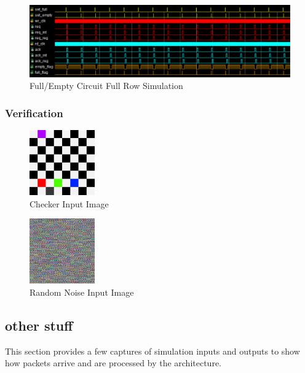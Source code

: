 \begin{figure}
    \centering
    \includegraphics[width=1.0\textwidth]{fig/full_empty_row_sim.png}
    \caption{Full/Empty Circuit Full Row Simulation}
    \label{fig:full_empty_row_sim}
\end{figure}

\subsubsection{Verification}

\begin{figure}
    \centering
    \includegraphics[width=0.25\textwidth]{fig/checker.png}
    \caption{Checker Input Image}
    \label{fig:checker_pattern}
\end{figure}

\begin{figure}
    \centering
    \includegraphics[width=0.25\textwidth]{fig/random_noise.png}
    \caption{Random Noise Input Image}
    \label{fig:random_noise}
\end{figure}

\subsection{other stuff}
This section provides a few captures of simulation inputs and outputs to show how packets arrive and are processed by the architecture.

